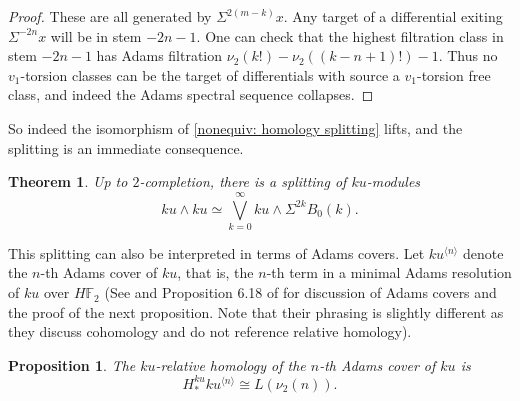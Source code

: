 \documentclass{amsart}
\newtheorem{theorem}[equation]{Theorem}
\newtheorem{proposition}[equation]{Proposition}
\theoremstyle{plain}
\numberwithin{equation}{section}
\numberwithin{figure}{section}
\DeclareMathOperator{\Ext}{Ext}
\newcommand{\mF}{{\mathbb F}}
\newcommand{\cE}{{\mathcal E}}
\newcommand{\0}{\langle 0 \rangle }
\begin{document}
\begin{proof}
These are all generated by $\Sigma^{2(m-k)}x$. Any target of a differential exiting $\Sigma^{-2n}x$ will be in stem $-2n-1$. One can check that the highest filtration class in stem $-2n-1$ has Adams filtration $\nu_2(k!) - \nu_2((k-n+1)!) - 1$. Thus no $v_1$-torsion classes can be the target of differentials with source a $v_1$-torsion free class, and indeed the Adams spectral sequence collapses. 

\end{proof}

So indeed the isomorphism of \cref{nonequiv: homology splitting} lifts, and the splitting is an immediate consequence.
\begin{theorem}
    Up to $2$-completion, there is a splitting of $ku$-modules
    \[ku \wedge ku \simeq \bigvee\limits_{k=0}^{\infty}ku\wedge \Sigma^{2 k}B_{0}(k).\]
\end{theorem}

This splitting can also be interpreted in terms of Adams covers. Let $ku^{\langle n \rangle}$ denote the $n$-th Adams cover of $ku$, that is, the $n$-th term in a minimal Adams resolution of $ku$ over $H\mF_{2}$ (See \cite[p.2-3]{lellmann1984operations} and Proposition 6.18 of \cite{kane1981operations} for discussion of Adams covers and the proof of the next proposition. Note that their phrasing is slightly different as they discuss cohomology and do not reference relative homology). 

\begin{proposition} \label{nonequiv:kuRelHomology}
The $ku$-relative homology of the $n$-th Adams cover of $ku$ is
    \[
    H_{*}^{ku}ku^{\langle n \rangle} \cong L(\nu_{2}(n)).
    \]
\end{proposition}
\end{document}
